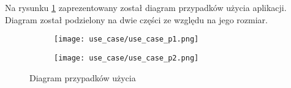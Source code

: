 \documentclass[../main.tex]{subfiles}
\begin{document}
Na rysunku \ref{fig:use_case:diagram} zaprezentowany został diagram przypadków użycia aplikacji. Diagram został podzielony na dwie części ze względu na jego rozmiar.

\begin{figure}[htb]
	\centering

	\begin{subfigure}{0.45\textwidth}
		\centering
		\texttt{[image: use\_case/use\_case\_p1.png]}
	\end{subfigure}
	\vertline
	\begin{subfigure}{0.45\textwidth}
		\centering
		\texttt{[image: use\_case/use\_case\_p2.png]}
	\end{subfigure}

	\caption{Diagram przypadków użycia}
	\label{fig:use_case:diagram}

\end{figure}
\end{document}
